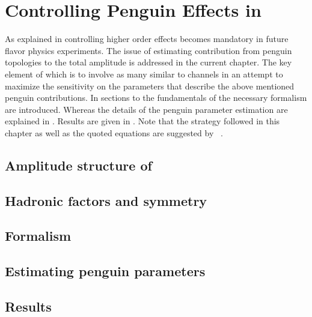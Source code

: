 
\chapter{Controlling Penguin Effects in \phis}
\label{Penguins}

As explained in  controlling higher order effects becomes mandatory in
future flavor physics experiments. The issue of estimating contribution from penguin topologies
to the total \BsJpsiPhi amplitude is addressed in the current chapter. The key element of which
is to involve as many similar to \BsJpsiPhi channels in an attempt to maximize the sensitivity on
the parameters that describe the above mentioned penguin contributions. In sections 
to  the fundamentals of the necessary formalism are introduced.
Whereas the details of the penguin parameter estimation are explained in .
Results are given in . Note that the strategy followed in this chapter
as well as the quoted equations are suggested by ~\cite{Fleischer:1999zi,Faller:2008gt,DeBruyn:2014oga}. 

\section{Amplitude structure of \BsJpsiPhi}
\label{jpsiphi_amp_struct}


\section{Hadronic factors and \grpsuthree symmetry}
\label{had_pars_suthree}


\section{Formalism}
\label{penguin_formalism}


\section{Estimating penguin parameters}
\label{penguin_more_chanells}


\section{Results}
\label{penguin_results}

